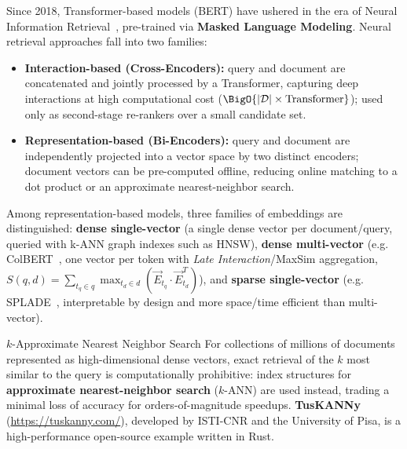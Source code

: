 Since 2018, Transformer-based models (BERT) have ushered in the era of Neural Information Retrieval~\cite{khattab2020,formal2021}, pre-trained via \textbf{Masked Language Modeling}. Neural retrieval approaches fall into two families:
\begin{itemize}
    \item \textbf{Interaction-based (Cross-Encoders):} query and document are concatenated and jointly processed by a Transformer, capturing deep interactions at high computational cost ($\BigO{|\mathcal{D}| \times \text{Transformer}}$); used only as second-stage re-rankers over a small candidate set.
    \item \textbf{Representation-based (Bi-Encoders):} query and document are independently projected into a vector space by two distinct encoders; document vectors can be pre-computed offline, reducing online matching to a dot product or an approximate nearest-neighbor search.
\end{itemize}

Among representation-based models, three families of embeddings are distinguished: \textbf{dense single-vector} (a single dense vector per document/query, queried with k-ANN graph indexes such as HNSW), \textbf{dense multi-vector} (e.g. ColBERT~\cite{khattab2020}, one vector per token with \textit{Late Interaction}/MaxSim aggregation, $S(q,d) = \sum_{t_q \in q} \max_{t_d \in d} (\vec{E}_{t_q} \cdot \vec{E}_{t_d}^T)$), and \textbf{sparse single-vector} (e.g. SPLADE~\cite{formal2021}, interpretable by design and more space/time efficient than multi-vector).

\begin{noteblock}{$k$-Approximate Nearest Neighbor Search}
For collections of millions of documents represented as high-dimensional dense vectors, exact retrieval of the $k$ most similar to the query is computationally prohibitive: index structures for \textbf{approximate nearest-neighbor search} ($k$-ANN) are used instead, trading a minimal loss of accuracy for orders-of-magnitude speedups. \textbf{TusKANNy} (\url{https://tuskanny.com/}), developed by ISTI-CNR and the University of Pisa, is a high-performance open-source example written in Rust.
\end{noteblock}
